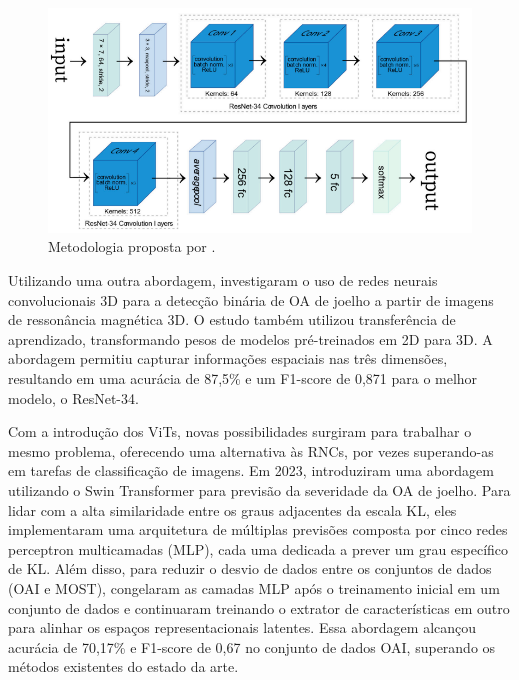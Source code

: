 \begin{figure}[!htbp]
    \centering
    \includegraphics[width=\textwidth]{figs/cueva2022.png}
    \caption{Metodologia proposta por .}
    \label{fig:cueva2022}
\end{figure}

Utilizando uma outra abordagem,  investigaram o uso de redes neurais convolucionais 3D para a detecção binária de OA de joelho a partir de imagens de ressonância magnética 3D. O estudo também utilizou transferência de aprendizado, transformando pesos de modelos pré-treinados em 2D para 3D. A abordagem permitiu capturar informações espaciais nas três dimensões, resultando em uma acurácia de 87,5\% e um F1-score de 0,871 para o melhor modelo, o ResNet-34.

Com a introdução dos ViTs, novas possibilidades surgiram para trabalhar o mesmo problema, oferecendo uma alternativa às RNCs, por vezes superando-as em tarefas de classificação de imagens. Em 2023,  introduziram uma abordagem utilizando o Swin Transformer para previsão da severidade da OA de joelho. Para lidar com a alta similaridade entre os graus adjacentes da escala KL, eles implementaram uma arquitetura de múltiplas previsões composta por cinco redes perceptron multicamadas (MLP), cada uma dedicada a prever um grau específico de KL. Além disso, para reduzir o desvio de dados entre os conjuntos de dados (OAI e MOST), congelaram as camadas MLP após o treinamento inicial em um conjunto de dados e continuaram treinando o extrator de características em outro para alinhar os espaços representacionais latentes. Essa abordagem alcançou acurácia de 70,17\% e F1-score de 0,67 no conjunto de dados OAI, superando os métodos existentes do estado da arte.

